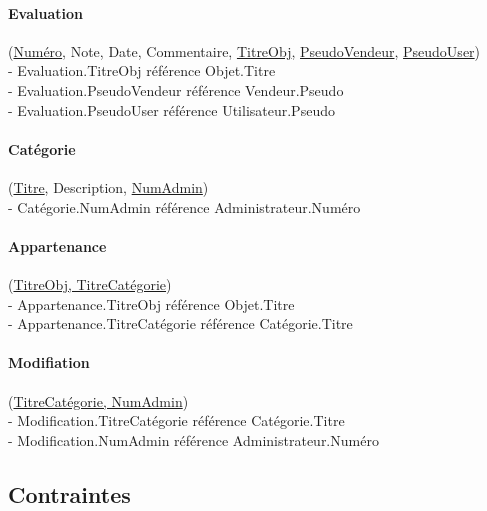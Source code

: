 \documentclass{article}
\begin{document}
\paragraph{Evaluation} (\underline{Numéro}, Note, Date, Commentaire, \underline{TitreObj}, \underline{PseudoVendeur}, \underline{PseudoUser})\\
\indent - Evaluation.TitreObj référence Objet.Titre\\
\indent - Evaluation.PseudoVendeur référence Vendeur.Pseudo\\
\indent - Evaluation.PseudoUser référence Utilisateur.Pseudo


\paragraph{Catégorie} (\underline{Titre}, Description, \underline{NumAdmin})\\
\indent - Catégorie.NumAdmin référence Administrateur.Numéro


\paragraph{Appartenance} (\underline{TitreObj, TitreCatégorie})\\
\indent - Appartenance.TitreObj référence Objet.Titre\\
\indent - Appartenance.TitreCatégorie référence Catégorie.Titre


\paragraph{Modifiation} (\underline{TitreCatégorie, NumAdmin})\\
\indent - Modification.TitreCatégorie référence Catégorie.Titre\\
\indent - Modification.NumAdmin référence Administrateur.Numéro


\subsection{Contraintes}
\end{document}
